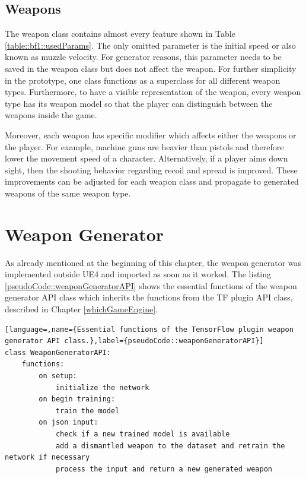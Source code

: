 \documentclass[MGS,Master,english]{twbook}%
\begin{document}
\subsection{Weapons}
The weapon class contains almost every feature shown in Table \ref{table::bf1::usedParams}. The only omitted parameter is the initial speed or also known as muzzle velocity. For generator reasons, this parameter needs to be saved in the weapon class but does not affect the weapon. For further simplicity in the prototype, one class functions as a superclass for all different weapon types. Furthermore, to have a visible representation of the weapon, every weapon type has its weapon model so that the player can distinguish between the weapons inside the game. 

Moreover, each weapon has specific modifier which affects either the weapons or the player. For example, machine guns are heavier than pistols and therefore lower the movement speed of a character. Alternatively, if a player aims down sight, then the shooting behavior regarding recoil and spread is improved. These improvements can be adjusted for each weapon class and propagate to generated weapons of the same weapon type.

\section{Weapon Generator}
As already mentioned at the beginning of this chapter, the weapon generator was implemented outside UE4 and imported as soon as it worked. The listing \ref{pseudoCode::weaponGeneratorAPI} shows the essential functions of the weapon generator API class which inherits the functions from the TF plugin API class, described in Chapter \ref{whichGameEngine}. 
\begin{lstlisting}[language=,name={Essential functions of the TensorFlow plugin weapon generator API class.},label={pseudoCode::weaponGeneratorAPI}]
class WeaponGeneratorAPI:
	functions:
		on setup:
			initialize the network
		on begin training:
			train the model
		on json input:
			check if a new trained model is available
			add a dismantled weapon to the dataset and retrain the network if necessary
			process the input and return a new generated weapon
\end{lstlisting}
\end{document}
